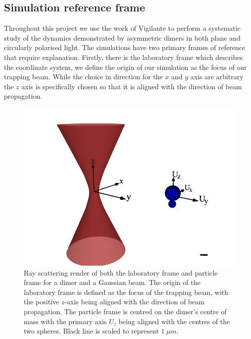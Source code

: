 \subsection{Simulation reference frame}
\label{sec:sim_parameters}
Throughout this project we use the work of Vigilante \cite{Vigilante2020} 
to perform a systematic study of the dynamics demonstrated by 
asymmetric dimers in both plane and circularly polarised light. 
The simulations have two primary frames of reference that require 
explanation. Firstly, there is the laboratory frame which 
describes the coordinate system, we define the origin of our 
simulation as the focus of our trapping beam. While the choice in 
direction for the $x$ and $y$ axis are arbitrary the $z$ axis is 
specifically chosen so that it is aligned with the direction of 
beam propagation. 
\begin{figure}[h!]
	\centering
	\includegraphics[width=0.6\linewidth]{lab_frame.png}
	\caption{Ray scattering render of both the laboratory frame and 
		particle frame for a dimer and a Gaussian beam. The origin 
		of the laboratory frame is defined as the focus of the 
		trapping beam, with the positive $z$-axis being aligned with 
		the direction of beam propagation. The particle frame is 
		centred on the dimer's centre of mass with the primary axis 
		$U_z$ being aligned with the centres of the two spheres. Black 
		line is scaled to represent $1\ \mu m$.}
	\label{fig:lab_frame} 
\end{figure} 

